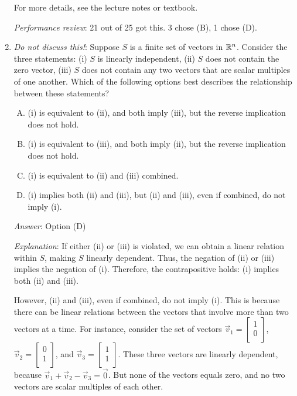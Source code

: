 \documentclass[10pt]{amsart}
\begin{document}
\begin{enumerate}
  For more details, see the lecture notes or textbook.

  {\em Performance review}: 21 out of 25 got this. 3 chose (B), 1 chose (D).

\item {\em Do not discuss this!}: Suppose $S$ is a finite set of
  vectors in $\mathbb{R}^n$. Consider the three statements: (i) $S$ is
  linearly independent, (ii) $S$ does not contain the zero vector,
  (iii) $S$ does not contain any two vectors that are scalar multiples
  of one another. Which of the following options best describes the
  relationship between these statements?

  \begin{enumerate}[(A)]
  \item (i) is equivalent to (ii), and both imply (iii), but the
    reverse implication does not hold.
  \item (i) is equivalent to (iii), and both imply (ii), but the
    reverse implication does not hold.
  \item (i) is equivalent to (ii) and (iii) combined.
  \item (i) implies both (ii) and (iii), but (ii) and (iii), even if
    combined, do not imply (i).
  \end{enumerate}

  {\em Answer}: Option (D)

  {\em Explanation}: If either (ii) or (iii) is violated, we can
  obtain a linear relation within $S$, making $S$ linearly
  dependent. Thus, the negation of (ii) or (iii) implies the negation
  of (i). Therefore, the contrapositive holds: (i) implies both (ii)
  and (iii).

  However, (ii) and (iii), even if combined, do not imply (i). This is
  because there can be linear relations between the vectors that
  involve more than two vectors at a time. For instance, consider the
  set of vectors $\vec{v}_1 = \left[\begin{matrix} 1 \\ 0
      \\\end{matrix}\right]$, $\vec{v}_2 = \left[\begin{matrix} 0 \\ 1
      \\\end{matrix}\right]$, and $\vec{v}_3 = \left[\begin{matrix} 1
      \\ 1 \\\end{matrix}\right]$. These three vectors are linearly
  dependent, because $\vec{v}_1 + \vec{v}_2 - \vec{v}_3 =
  \vec{0}$. But none of the vectors equals zero, and no two vectors
  are scalar multiples of each other.


\end{enumerate}
\end{document}
